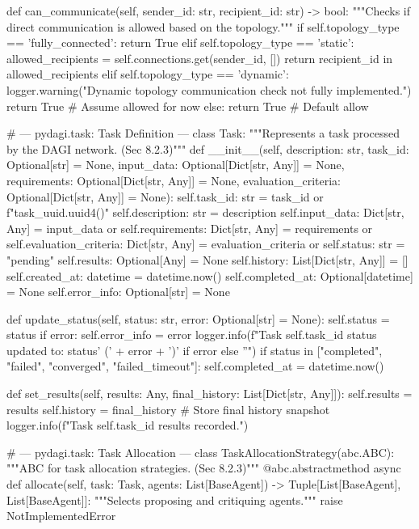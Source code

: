 \documentclass{amsbook}
\theoremstyle{definition}
\theoremstyle{remark}
\numberwithin{equation}{chapter} %
\begin{document}
\begin{python}
    def can_communicate(self, sender_id: str, recipient_id: str) -> bool:
        """Checks if direct communication is allowed based on the topology."""
        if self.topology_type == 'fully_connected':
             return True
        elif self.topology_type == 'static':
             allowed_recipients = self.connections.get(sender_id, [])
             return recipient_id in allowed_recipients
        elif self.topology_type == 'dynamic':
             logger.warning("Dynamic topology communication check not fully implemented.")
             return True # Assume allowed for now
        else:
            return True # Default allow

# --- pydagi.task: Task Definition ---
class Task:
    """Represents a task processed by the DAGI network. (Sec 8.2.3)"""
    def __init__(self,
                 description: str,
                 task_id: Optional[str] = None,
                 input_data: Optional[Dict[str, Any]] = None,
                 requirements: Optional[Dict[str, Any]] = None,
                 evaluation_criteria: Optional[Dict[str, Any]] = None):
        self.task_id: str = task_id or f"task_{uuid.uuid4()}"
        self.description: str = description
        self.input_data: Dict[str, Any] = input_data or {}
        self.requirements: Dict[str, Any] = requirements or {}
        self.evaluation_criteria: Dict[str, Any] = evaluation_criteria or {}
        self.status: str = "pending"
        self.results: Optional[Any] = None
        self.history: List[Dict[str, Any]] = []
        self.created_at: datetime = datetime.now()
        self.completed_at: Optional[datetime] = None
        self.error_info: Optional[str] = None

    def update_status(self, status: str, error: Optional[str] = None):
        self.status = status
        if error:
            self.error_info = error
        logger.info(f"Task {self.task_id} status updated to: {status}{' (' + error + ')' if error else ''}")
        if status in ["completed", "failed", "converged", "failed_timeout"]:
             self.completed_at = datetime.now()

    def set_results(self, results: Any, final_history: List[Dict[str, Any]]):
         self.results = results
         self.history = final_history # Store final history snapshot
         logger.info(f"Task {self.task_id} results recorded.")


# --- pydagi.task: Task Allocation ---
class TaskAllocationStrategy(abc.ABC):
    """ABC for task allocation strategies. (Sec 8.2.3)"""
    @abc.abstractmethod
    async def allocate(self, task: Task, agents: List[BaseAgent]) -> Tuple[List[BaseAgent], List[BaseAgent]]:
        """Selects proposing and critiquing agents."""
        raise NotImplementedError



\end{python}
\end{document}
